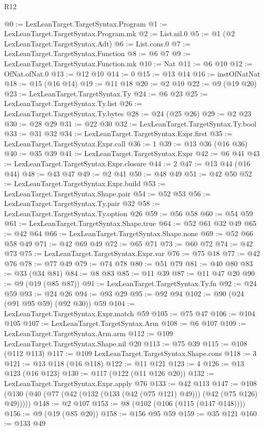 \begin{lexlean}{R12}
\begin{coremodule}
@0 := LexLeanTarget.TargetSyntax.Program
@1 := LexLeanTarget.TargetSyntax.Program.mk
@2 := List.nil.{0}
@5 := @1 (@2 LexLeanTarget.TargetSyntax.Adt)
@6 := List.cons.{0}
@7 := LexLeanTarget.TargetSyntax.Function
@8 := @6 @7
@9 := LexLeanTarget.TargetSyntax.Function.mk
@10 := Nat
@11 := @6 @10
@12 := OfNat.ofNat.{0}
@13 := @12 @10
@14 := 0
@15 := @13 @14
@16 := instOfNatNat
@18 := @15 (@16 @14)
@19 := @11 @18
@20 := @2 @10
@22 := @9 (@19 @20)
@23 := LexLeanTarget.TargetSyntax.Ty
@24 := @6 @23
@25 := LexLeanTarget.TargetSyntax.Ty.list
@26 := LexLeanTarget.TargetSyntax.Ty.bytes
@28 := @24 (@25 @26)
@29 := @2 @23
@30 := @28 @29
@31 := @22 @30
@32 := LexLeanTarget.TargetSyntax.Ty.bool
@33 := @31 @32
@34 := LexLeanTarget.TargetSyntax.Expr.first
@35 := LexLeanTarget.TargetSyntax.Expr.call
@36 := 1
@39 := @13 @36 (@16 @36)
@40 := @35 @39
@41 := LexLeanTarget.TargetSyntax.Expr
@42 := @6 @41
@43 := LexLeanTarget.TargetSyntax.Expr.closure
@44 := 2
@47 := @13 @44 (@16 @44)
@48 := @43 @47
@49 := @2 @41
@50 := @48 @49
@51 := @42 @50
@52 := LexLeanTarget.TargetSyntax.Expr.build
@53 := LexLeanTarget.TargetSyntax.Shape.pair
@54 := @52 @53
@56 := LexLeanTarget.TargetSyntax.Ty.pair @32
@58 := LexLeanTarget.TargetSyntax.Ty.option @26
@59 := @56 @58
@60 := @54 @59
@61 := LexLeanTarget.TargetSyntax.Shape.true
@64 := @52 @61 @32 @49
@65 := @42 @64
@66 := LexLeanTarget.TargetSyntax.Shape.none
@69 := @52 @66 @58 @49
@71 := @42 @69 @49
@72 := @65 @71
@73 := @60 @72
@74 := @42 @73
@75 := LexLeanTarget.TargetSyntax.Expr.var
@76 := @75 @18
@77 := @42 @76
@78 := @77 @49
@79 := @74 @78
@80 := @51 @79
@81 := @40 @80
@83 := @33 (@34 @81)
@84 := @8 @83
@85 := @11 @39
@87 := @11 @47 @20
@90 := @9 (@19 (@85 @87))
@91 := LexLeanTarget.TargetSyntax.Ty.fn
@92 := @24 @59
@93 := @24 @26
@94 := @93 @29
@95 := @92 @94
@102 := @90 (@24 (@91 @95 @59) (@92 @30)) @59
@104 := LexLeanTarget.TargetSyntax.Expr.match @59
@105 := @75 @47
@106 := @104 @105
@107 := LexLeanTarget.TargetSyntax.Arm
@108 := @6 @107
@109 := LexLeanTarget.TargetSyntax.Arm.arm
@112 := @109 LexLeanTarget.TargetSyntax.Shape.nil @20
@113 := @75 @39
@115 := @108 (@112 @113)
@117 := @109 LexLeanTarget.TargetSyntax.Shape.cons
@118 := 3
@121 := @13 @118 (@16 @118)
@122 := @11 @121
@123 := 4
@126 := @13 @123 (@16 @123)
@130 := @117 (@122 (@11 @126 @20))
@132 := LexLeanTarget.TargetSyntax.Expr.apply @76
@133 := @42 @113
@147 := @108 (@130 (@40 (@77 (@42 (@132 (@133 (@42 (@75 @121) @49))) (@42 (@75 @126) @49)))))
@148 := @2 @107
@153 := @8 (@102 (@106 (@115 (@147 @148))))
@156 := @9 (@19 (@85 @20))
@158 := @156 @95 @59
@159 := @35 @121
@160 := @133 @49

\end{coremodule}
\end{lexlean}
